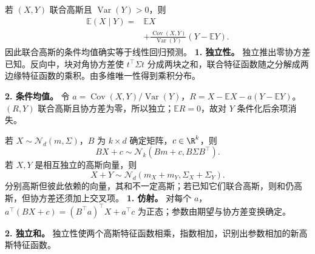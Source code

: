 若 $(X,Y)$ 联合高斯且 $\operatorname{Var}(Y)>0$，则
\[
\begin{aligned}
\mathbb E(X\mid Y)={}&\mathbb EX\\
&+\frac{\operatorname{Cov}(X,Y)}{\operatorname{Var}(Y)}
(Y-\mathbb EY).
\end{aligned}
\]
因此联合高斯的条件均值确实等于线性回归预测。
\textbf{1. 独立性。} 独立推出零协方差已知。反向中，块对角协方差使 $t^\top\Sigma t$ 分成两块之和，联合特征函数随之分解成两边缘特征函数的乘积。由多维唯一性得到乘积分布。

\textbf{2. 条件均值。} 令 $a=\operatorname{Cov}(X,Y)/\operatorname{Var}(Y)$，$R=X-\mathbb EX-a(Y-\mathbb EY)$。$(R,Y)$ 联合高斯且协方差为零，所以独立；$\mathbb ER=0$，故对 $Y$ 条件化后余项消失。

若 $X\sim\mathcal N_d(m,\Sigma)$，$B$ 为 $k\times d$ 确定矩阵，$c\in\R^k$，则
\[
BX+c\sim\mathcal N_k(Bm+c,B\Sigma B^\top).
\]
若 $X,Y$ 是相互独立的高斯向量，则
\[
X+Y\sim\mathcal N_d(m_X+m_Y,\Sigma_X+\Sigma_Y).
\]
分别高斯但彼此依赖的向量，其和不一定高斯；若已知它们联合高斯，则和仍高斯，但协方差还须加上交叉项。
\textbf{1. 仿射。} 对每个 $a$，$a^\top(BX+c)=(B^\top a)^\top X+a^\top c$ 为正态；参数由期望与协方差变换确定。

\textbf{2. 独立和。} 独立性使两个高斯特征函数相乘，指数相加，识别出参数相加的新高斯特征函数。
